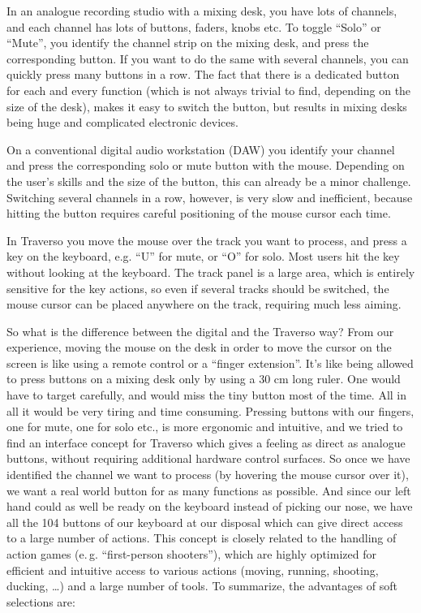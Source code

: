 In an analogue recording studio with a mixing desk, you have lots of channels, and each channel has lots of buttons, faders, knobs etc. To toggle ``Solo'' or ``Mute'', you identify the channel strip on the mixing desk, and press the corresponding button. If you want to do the same with several channels, you can quickly press many buttons in a row. The fact that there is a dedicated button for each and every function (which is not always trivial to find, depending on the size of the desk), makes it easy to switch the button, but results in mixing desks being huge and complicated electronic devices.

On a conventional digital audio workstation (DAW) you identify your channel and press the corresponding solo or mute button with the mouse. Depending on the user's skills and the size of the button, this can already be a minor challenge. Switching several channels in a row, however, is very slow and inefficient, because hitting the button requires careful positioning of the mouse cursor each time.

In Traverso you move the mouse over the track you want to process, and press a key on the keyboard, e.g. ``U'' for mute, or ``O'' for solo. Most users hit the key without looking at the keyboard. The track panel is a large area, which is entirely sensitive for the key actions, so even if several tracks should be switched, the mouse cursor can be placed anywhere on the track, requiring much less aiming.

So what is the difference between the digital and the Traverso way? From our experience, moving the mouse on the desk in order to move the cursor on the screen is like using a remote control or a ``finger extension''. It's like being allowed to press buttons on a mixing desk only by using a 30 cm long ruler. One would have to target carefully, and would miss the tiny button most of the time. All in all it would be very tiring and time consuming. Pressing buttons with our fingers, one for mute, one for solo etc., is more ergonomic and intuitive, and we tried to find an interface concept for Traverso which gives a feeling as direct as analogue buttons, without requiring additional hardware control surfaces. So once we have identified the channel we want to process (by hovering the mouse cursor over it), we want a real world button for as many functions as possible. And since our left hand could as well be ready on the keyboard instead of picking our nose, we have all the 104 buttons of our keyboard at our disposal which can give direct access to a large number of actions. This concept is closely related to the handling of action games (e.\,g. ``first-person shooters''), which are highly optimized for efficient and intuitive access to various actions (moving, running, shooting, ducking, \dots) and a large number of tools. To summarize, the advantages of soft selections are:


